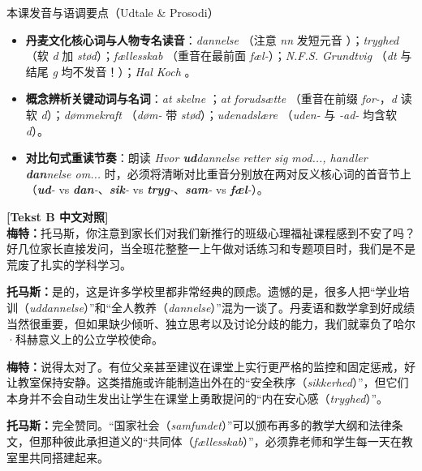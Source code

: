 \begin{tipbox}{本课发音与语调要点（Udtale \& Prosodi）}
\begin{itemize}
  \item \textbf{丹麦文化核心词与人物专名读音}：\textit{dannelse} （注意 \textit{nn} 发短元音 ）；\textit{tryghed} （软 \textit{d} 加 \textit{stød}）；\textit{fællesskab} （重音在最前面 \textit{fæl-}）；\textit{N.F.S. Grundtvig} （\textit{dt} 与结尾 \textit{g} 均不发音！）；\textit{Hal Koch} 。
  \item \textbf{概念辨析关键动词与名词}：\textit{at skelne} ；\textit{at forudsætte} （重音在前缀 \textit{for-}，\textit{d} 读软 \textit{d}）；\textit{dømmekraft} （\textit{døm-} 带 \textit{stød}）；\textit{udenadslære} （\textit{uden-} 与 \textit{-ad-} 均含软 \textit{d}）。
  \item \textbf{对比句式重读节奏}：朗读 \textit{Hvor \textbf{ud}dannelse retter sig mod..., handler \textbf{dan}nelse om...} 时，必须将清晰对比重音分别放在两对反义核心词的首音节上（\textit{\textbf{ud}-} vs \textit{\textbf{dan}-}、\textit{\textbf{sik}-} vs \textit{\textbf{tryg}-}、\textit{\textbf{sam}-} vs \textit{\textbf{fæl}-}）。
\end{itemize}
\end{tipbox}

\begin{transbox}
\small
\textbf{\color{NCDTeal}[Tekst B 中文对照]}\\
\textbf{梅特：}托马斯，你注意到家长们对我们新推行的班级心理福祉课程感到不安了吗？好几位家长直接发问，当全班花整整一上午做对话练习和专题项目时，我们是不是荒废了扎实的学科学习。

\textbf{托马斯：}是的，这是许多学校里都非常经典的顾虑。遗憾的是，很多人把“学业培训（\textit{uddannelse}）”和“全人教养（\textit{dannelse}）”混为一谈了。丹麦语和数学拿到好成绩当然很重要，但如果缺少倾听、独立思考以及讨论分歧的能力，我们就辜负了哈尔·科赫意义上的公立学校使命。

\textbf{梅特：}说得太对了。有位父亲甚至建议在课堂上实行更严格的监控和固定惩戒，好让教室保持安静。这类措施或许能制造出外在的“安全秩序（\textit{sikkerhed}）”，但它们本身并不会自动生发出让学生在课堂上勇敢提问的“内在安心感（\textit{tryghed}）”。

\textbf{托马斯：}完全赞同。“国家社会（\textit{samfundet}）”可以颁布再多的教学大纲和法律条文，但那种彼此承担道义的“共同体（\textit{fællesskab}）”，必须靠老师和学生每一天在教室里共同搭建起来。
\end{transbox}


